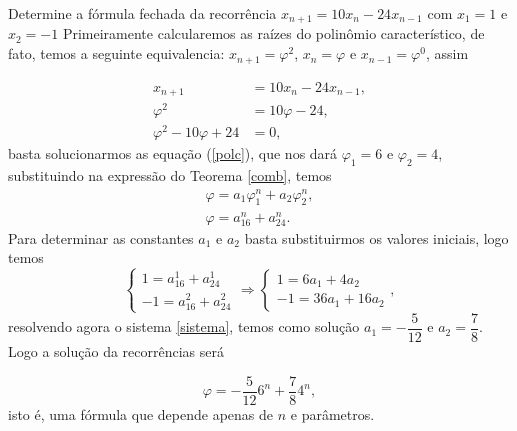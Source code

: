 \inic Determine a fórmula fechada da recorrência $x_{n+1} = 10x_{n} - 24x_{n-1}$ com $x_1 = 1$ e $x_2 = -1$
Primeiramente calcularemos as raízes do polinômio característico, de fato, temos a seguinte equivalencia: $x_{n+1} = \varphi^2$, $x_n = \varphi$ e $x_{n-1} = \varphi^0$, assim

\begin{align}
    x_{n+1} &= 10x_{n} - 24x_{n-1},\\
    \varphi^2 &= 10\varphi - 24,\\
    \varphi^2 - 10\varphi + 24 &= 0,
\end{align}
basta solucionarmos as equação (\ref{polc}), que nos dará $\varphi_1 = 6$ e $\varphi_2 = 4$, substituindo na expressão do Teorema \ref{comb}, temos 
\begin{align*}
    \varphi = a_1\varphi_1^n + a_2\varphi_2^n,\\
    \varphi = a_16^n + a_24^n.
\end{align*}
\inic Para determinar as constantes $a_1$ e $a_2$ basta substituirmos os valores iniciais, logo temos
\begin{equation}
\label{sistema}
    \begin{cases}
     1 = a_16^1 + a_24^1\\
    -1 = a_16^2 + a_24^2
    \end{cases}
    \Rightarrow
    \begin{cases}
     1 = 6a_1 + 4a_2\\
    -1 = 36a_1 + 16a_2
    \end{cases},
\end{equation}
resolvendo agora o sistema \ref{sistema}, temos como solução $a_1 = -\dfrac{5}{12}$ e $a_2 = \dfrac{7}{8}$. Logo a solução da recorrências será

\begin{equation}
    \varphi = -\dfrac{5}{12}6^n + \dfrac{7}{8}4^n,
\end{equation}
isto é, uma fórmula que depende apenas de $n$ e parâmetros. 

